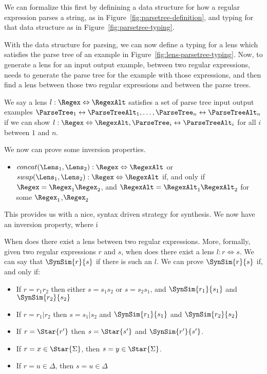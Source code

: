 We can formalize this first by definining a data structure for how a regular
expression parses a string, as in Figure~\ref{fig:parsetree-definition},
and typing for that data structure as in Figure~\ref{fig:parsetree-typing}.



With the data structure for parsing, we can now define a typing for a lens
which satisfies the parse tree of an example in Figure~\ref{fig:lens-parsetree-typing}.  Now, to generate a lens for an input output example,
between two regular expressions,
needs to generate the parse tree for the example with those expressions,
and then find a lens between those two regular expressions and between the parse trees.

We say a lens $l : \Regex \Leftrightarrow \RegexAlt$ satisfies a set of parse tree input output examples $\ParseTree_1 \leftrightarrow \ParseTreeAlt_1, \ldots, \ParseTree_n \leftrightarrow \ParseTreeAlt_n$
if we can show $l : \Regex \Leftrightarrow \RegexAlt, \ParseTree_i \leftrightarrow \ParseTreeAlt_i$ for all $i$ between $1$ and $n$.

\iffalse
We now can prove some inversion properties.
\begin{itemize}
\item $concat(\Lens_1,\Lens_2) : \Regex \Leftrightarrow \RegexAlt$ or
$swap(\Lens_1,\Lens_2) : \Regex \Leftrightarrow \RegexAlt$
if, and only if $\Regex = \Regex_1\Regex_2$, and $\RegexAlt = \RegexAlt_1\RegexAlt_2$ for some $\Regex_1$,$\Regex_2$
\end{itemize}
This provides us with a nice, syntax driven strategy for synthesis.
We now have an inversion property, where i

When does there exist a lens between two regular expressions.
More, formally, given two regular expressions $r$ and $s$, when does there exist a lens $l : r \Leftrightarrow s$.
We can say that $\SynSim{r}{s}$ if there is such an $l$.
We can prove $\SynSim{r}{s}$ if, and only if:
\begin{itemize}
\item If $r = r_1 r_2$ then either $s = s_1 s_2$ or $s = s_2 s_1$, and $\SynSim{r_1}{s_1}$ and $\SynSim{r_2}{s_2}$
\item If $r = r_1 | r_2$ then $s = s_1 | s_2$ and $\SynSim{r_1}{s_1}$ and $\SynSim{r_2}{s_2}$
\item If $r = \Star{r'}$ then $s = \Star{s'}$ and $\SynSim{r'}{s'}$.
\item If $r = x\in\Star{\Sigma}$, then $s = y\in\Star{\Sigma}$.
\item If $r = u\in\Delta$, then $s = u\in\Delta$
\end{itemize}

